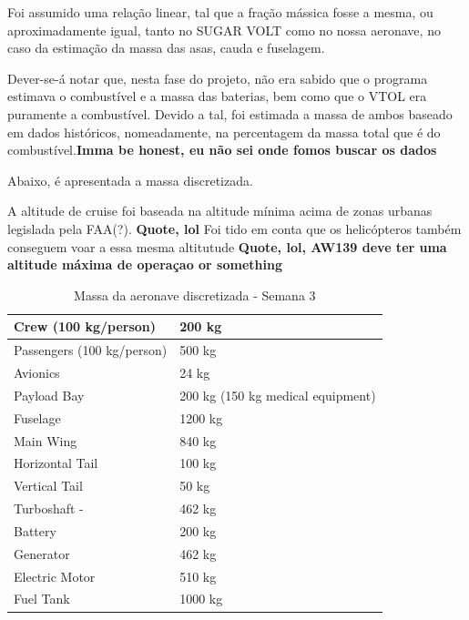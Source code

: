 \FloatBarrier
Foi assumido uma relação linear, tal que a fração mássica fosse a mesma, ou aproximadamente igual, tanto no SUGAR VOLT como no nossa aeronave, no caso da estimação da massa das asas, cauda e fuselagem.\par
Dever-se-á notar que, nesta fase do projeto, não era sabido que o programa estimava o combustível e a massa das baterias, bem como que o VTOL era puramente a combustível. Devido a tal, foi estimada a massa de ambos baseado em dados históricos, nomeadamente, na percentagem da massa total que é do combustível.\textbf{Imma be honest, eu não sei onde fomos buscar os dados}\par
Abaixo, é apresentada a massa discretizada.\par
A altitude de cruise foi baseada na altitude mínima acima de zonas urbanas legislada pela FAA(?). \textbf{{\large{Quote, lol}}} Foi tido em conta que os helicópteros também conseguem voar a essa mesma altitutude \textbf{\large{{Quote, lol, AW139 deve ter uma altitude máxima de operaçao or something}}}
\FloatBarrier
\begin{table}[h]
\begin{tabular}{|l|l|}
\hline
Crew (100 kg/person)       & 200 kg                            \\ \hline
Passengers (100 kg/person) & 500 kg                            \\ \hline
Avionics                   & 24 kg                             \\ \hline
Payload Bay                & 200 kg (150 kg medical equipment) \\ \hline
Fuselage                   & 1200 kg                           \\ \hline
Main Wing                  & 840 kg                            \\ \hline
Horizontal Tail            & 100 kg                            \\ \hline
Vertical Tail              & 50 kg                             \\ \hline
Turboshaft -               & 462 kg                            \\ \hline
Battery                    & 200 kg                            \\ \hline
Generator                  & 462 kg                            \\ \hline
Electric Motor             & 510 kg                            \\ \hline
Fuel Tank                  & 1000 kg                           \\ \hline
\end{tabular}
\caption{Massa da aeronave discretizada - Semana 3}
\end{table}
\FloatBarrier
